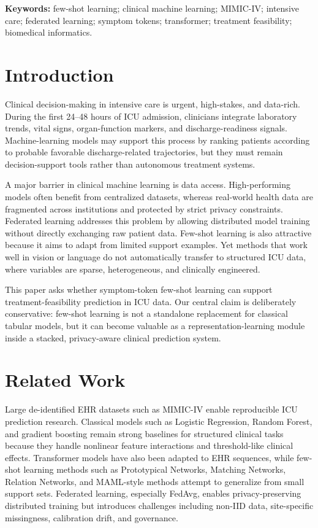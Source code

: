 \documentclass[11pt]{article}
\begin{document}
\noindent\textbf{Keywords:} few-shot learning; clinical machine learning; MIMIC-IV; intensive care; federated learning; symptom tokens; transformer; treatment feasibility; biomedical informatics.

\section{Introduction}
Clinical decision-making in intensive care is urgent, high-stakes, and data-rich. During the first 24--48 hours of ICU admission, clinicians integrate laboratory trends, vital signs, organ-function markers, and discharge-readiness signals. Machine-learning models may support this process by ranking patients according to probable favorable discharge-related trajectories, but they must remain decision-support tools rather than autonomous treatment systems.

A major barrier in clinical machine learning is data access. High-performing models often benefit from centralized datasets, whereas real-world health data are fragmented across institutions and protected by strict privacy constraints. Federated learning addresses this problem by allowing distributed model training without directly exchanging raw patient data. Few-shot learning is also attractive because it aims to adapt from limited support examples. Yet methods that work well in vision or language do not automatically transfer to structured ICU data, where variables are sparse, heterogeneous, and clinically engineered.

This paper asks whether symptom-token few-shot learning can support treatment-feasibility prediction in ICU data. Our central claim is deliberately conservative: few-shot learning is not a standalone replacement for classical tabular models, but it can become valuable as a representation-learning module inside a stacked, privacy-aware clinical prediction system.

\section{Related Work}
Large de-identified EHR datasets such as MIMIC-IV enable reproducible ICU prediction research. Classical models such as Logistic Regression, Random Forest, and gradient boosting remain strong baselines for structured clinical tasks because they handle nonlinear feature interactions and threshold-like clinical effects. Transformer models have also been adapted to EHR sequences, while few-shot learning methods such as Prototypical Networks, Matching Networks, Relation Networks, and MAML-style methods attempt to generalize from small support sets. Federated learning, especially FedAvg, enables privacy-preserving distributed training but introduces challenges including non-IID data, site-specific missingness, calibration drift, and governance.
\end{document}
